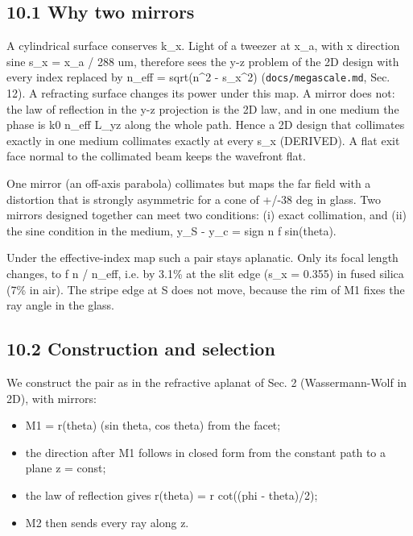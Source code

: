 \hypertarget{101-why-two-mirrors}{%
\subsection{10.1 Why two mirrors}\label{collimator-101-why-two-mirrors}}

A cylindrical surface conserves k\_x. Light of a tweezer at x\_a, with x
direction sine s\_x = x\_a / 288 um, therefore sees the y-z problem of
the 2D design with every index replaced by n\_eff = sqrt(n\^{}2 -
s\_x\^{}2) (\texttt{docs/megascale.md}, Sec. 12). A refracting surface
changes its power under this map. A mirror does not: the law of
reflection in the y-z projection is the 2D law, and in one medium the
phase is k0 n\_eff L\_yz along the whole path. Hence a 2D design that
collimates exactly in one medium collimates exactly at every s\_x
(DERIVED). A flat exit face normal to the collimated beam keeps the
wavefront flat.

One mirror (an off-axis parabola) collimates but maps the far field with
a distortion that is strongly asymmetric for a cone of +/-38 deg in
glass. Two mirrors designed together can meet two conditions: (i) exact
collimation, and (ii) the sine condition in the medium, y\_S - y\_c =
sign n f sin(theta).

Under the effective-index map such a pair stays aplanatic. Only its
focal length changes, to f n / n\_eff, i.e. by 3.1\% at the slit edge
(s\_x = 0.355) in fused silica (7\% in air). The stripe edge at S does
not move, because the rim of M1 fixes the ray angle in the glass.

\hypertarget{102-construction-and-selection}{%
\subsection{10.2 Construction and
selection}\label{collimator-102-construction-and-selection}}

We construct the pair as in the refractive aplanat of Sec. 2
(Wassermann-Wolf in 2D), with mirrors:

\begin{itemize}
\tightlist
\item
  M1 = r(theta) (sin theta, cos theta) from the facet;
\item
  the direction after M1 follows in closed form from the constant path
  to a plane z = const;
\item
  the law of reflection gives r\textquotesingle(theta) = r cot((phi -
  theta)/2);
\item
  M2 then sends every ray along z.
\end{itemize}

